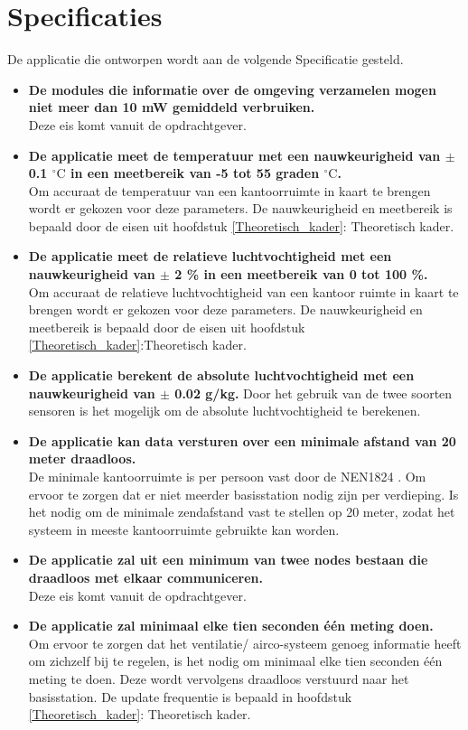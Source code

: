 \section{Specificaties}
De applicatie die ontworpen wordt aan de volgende Specificatie gesteld.
\begin{itemize}
    \item \textbf{De modules die informatie over de omgeving verzamelen mogen niet meer dan 10 mW gemiddeld verbruiken.} 
    \\Deze eis komt vanuit de opdrachtgever.
    \item \textbf{De applicatie meet de temperatuur met een nauwkeurigheid van $\pm$ 0.1 $^\circ\text{C}$ in een meetbereik van -5 tot 55 graden $^\circ\text{C}$.} 
    \\Om accuraat de temperatuur van een kantoorruimte in kaart te brengen wordt er gekozen voor deze parameters. De nauwkeurigheid en meetbereik is bepaald door de eisen uit hoofdstuk \ref{Theoretisch_kader}: Theoretisch kader.
    \item \textbf{De applicatie meet de relatieve luchtvochtigheid met een nauwkeurigheid van $\pm$ 2 \% in een meetbereik van 0 tot 100 \%.} 
    \\Om accuraat de relatieve luchtvochtigheid van een kantoor ruimte in kaart te brengen wordt er gekozen voor deze parameters. De nauwkeurigheid en meetbereik is bepaald door de eisen uit hoofdstuk \ref{Theoretisch_kader}:Theoretisch kader.
    \item \textbf{De applicatie berekent de absolute luchtvochtigheid met een nauwkeurigheid van $\pm$ 0.02 g/kg.} Door het gebruik van de twee soorten sensoren is het mogelijk om de absolute luchtvochtigheid te berekenen.
    \item \textbf{De applicatie kan data versturen over een minimale afstand van 20 meter draadloos.} 
    \\De minimale kantoorruimte is per persoon vast door de NEN1824 \cite{NEN1824}. Om ervoor te zorgen dat er niet meerder basisstation nodig zijn per verdieping. Is het nodig om de minimale zendafstand vast te stellen op 20 meter, zodat het systeem in meeste kantoorruimte gebruikte kan worden.
    \item \textbf{De applicatie zal uit een minimum van twee nodes bestaan die draadloos met elkaar communiceren.} 
    \\Deze eis komt vanuit de opdrachtgever.
    \item \textbf{De applicatie zal minimaal elke tien seconden één meting doen.} 
    \\Om ervoor te zorgen dat het ventilatie/ airco-systeem genoeg informatie heeft om zichzelf bij te regelen, is het nodig om minimaal elke tien seconden één meting te doen. Deze wordt vervolgens draadloos verstuurd naar het basisstation. De update frequentie is bepaald in hoofdstuk \ref{Theoretisch_kader}: Theoretisch kader.
\end{itemize}
